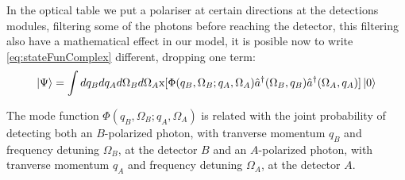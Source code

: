 In the optical table we put a polariser at certain directions at the detections modules,
filtering some of the photons before reaching the detector, this filtering also have a mathematical effect in our model, 
it is posible now to write \ref{eq:stateFunComplex} different, dropping one term:
\begin{equation}
\label{eq:stateFun}
\ket{\Psi}=\int dq_B dq_A d\Omega_B d\Omega_A 
\text{x} [\Phi(q_B,\Omega_B;q_A,\Omega_A) \hat{a}^{\dagger} (\Omega_B,q_B) \hat{a}^{\dagger}(\Omega_A,q_A) 
] \ket{0}  
\end{equation}

The mode function  $\Phi(q_B,\Omega_B;q_A,\Omega_A)$ is related with the joint probability of detecting both an $B$-polarized
photon, with tranverse momentum $q_B$ and frequency detuning $\Omega_B$, at the detector $B$ 
and an $A$-polarized
photon, with tranverse momentum $q_A$ and frequency detuning $\Omega_A$, at the detector $A$. 

